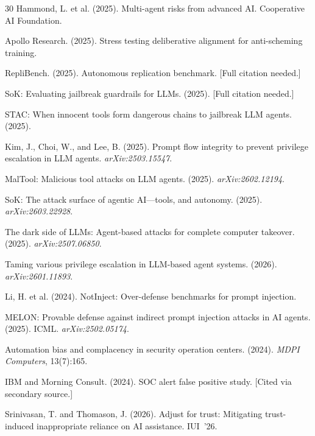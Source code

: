 \documentclass[10pt]{article}
\begin{document}
\begin{thebibliography}{30}
Hammond, L. et al. (2025). Multi-agent risks from advanced AI. Cooperative AI Foundation.

Apollo Research. (2025). Stress testing deliberative alignment for anti-scheming training.

RepliBench. (2025). Autonomous replication benchmark. [Full citation needed.]

SoK: Evaluating jailbreak guardrails for LLMs. (2025). [Full citation needed.]

STAC: When innocent tools form dangerous chains to jailbreak LLM agents. (2025).

Kim, J., Choi, W., and Lee, B. (2025). Prompt flow integrity to prevent privilege escalation in LLM agents. \emph{arXiv:2503.15547}.

MalTool: Malicious tool attacks on LLM agents. (2025). \emph{arXiv:2602.12194}.

SoK: The attack surface of agentic AI---tools, and autonomy. (2025). \emph{arXiv:2603.22928}.

The dark side of LLMs: Agent-based attacks for complete computer takeover. (2025). \emph{arXiv:2507.06850}.

Taming various privilege escalation in LLM-based agent systems. (2026). \emph{arXiv:2601.11893}.

Li, H. et al. (2024). NotInject: Over-defense benchmarks for prompt injection.

MELON: Provable defense against indirect prompt injection attacks in AI agents. (2025). ICML. \emph{arXiv:2502.05174}.

Automation bias and complacency in security operation centers. (2024). \emph{MDPI Computers}, 13(7):165.

IBM and Morning Consult. (2024). SOC alert false positive study. [Cited via secondary source.]

Srinivasan, T. and Thomason, J. (2026). Adjust for trust: Mitigating trust-induced inappropriate reliance on AI assistance. IUI~'26.


\end{thebibliography}
\end{document}
